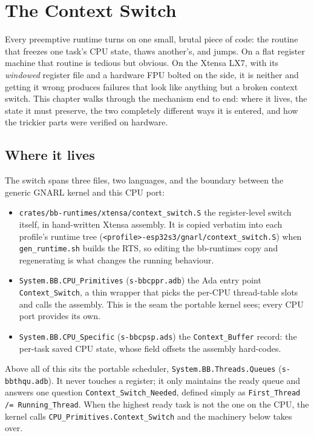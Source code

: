 \chapter{The Context Switch}
\label{ch:context-switch}

Every preemptive runtime turns on one small, brutal piece of code: the routine
that freezes one task's CPU state, thaws another's, and jumps. On a flat
register machine that routine is tedious but obvious. On the Xtensa LX7, with its
\emph{windowed} register file and a hardware FPU bolted on the side, it is neither
\textemdash{} and getting it wrong produces failures that look like anything but a
broken context switch. This chapter walks through the mechanism end to end: where
it lives, the state it must preserve, the two completely different ways it is
entered, and how the trickier parts were verified on hardware.

\section{Where it lives}

The switch spans three files, two languages, and the boundary between the generic
GNARL kernel and this CPU port:

\begin{itemize}
  \item \texttt{crates/bb-runtimes/xtensa/context\_switch.S} \textemdash{} the
        register-level switch itself, in hand-written Xtensa assembly. It is
        copied verbatim into each profile's runtime tree
        (\texttt{<profile>-esp32s3/gnarl/context\_switch.S}) when
        \texttt{gen\_runtime.sh} builds the RTS, so editing the bb-runtimes copy
        and regenerating is what changes the running behaviour.
  \item \texttt{System.BB.CPU\_Primitives} (\texttt{s-bbcppr.adb}) \textemdash{}
        the Ada entry point \texttt{Context\_Switch}, a thin wrapper that picks
        the per-CPU thread-table slots and calls the assembly. This is the seam
        the portable kernel sees; every CPU port provides its own.
  \item \texttt{System.BB.CPU\_Specific} (\texttt{s-bbcpsp.ads}) \textemdash{} the
        \texttt{Context\_Buffer} record: the per-task saved CPU state, whose field
        offsets the assembly hard-codes.
\end{itemize}

Above all of this sits the portable scheduler, \texttt{System.BB.Threads.Queues}
(\texttt{s-bbthqu.adb}). It never touches a register; it only maintains the ready
queue and answers one question \textemdash{} \texttt{Context\_Switch\_Needed},
defined simply as \texttt{First\_Thread /= Running\_Thread}. When the highest
ready task is not the one on the CPU, the kernel calls
\texttt{CPU\_Primitives.Context\_Switch} and the machinery below takes over.

